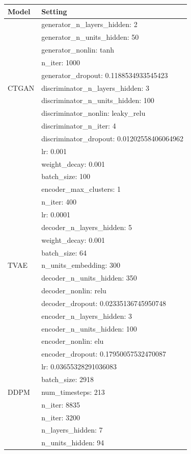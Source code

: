 \documentclass{article}
\theoremstyle{plain}
\theoremstyle{definition}
\theoremstyle{remark}
\begin{document}
\begin{table}[ht!]
\centering
\begin{tabular}{l|l}
\toprule
\textbf{Model} & \textbf{Setting} \\
\midrule
 & generator\_n\_layers\_hidden: 2\\ 
 & generator\_n\_units\_hidden: 50\\ 
 & generator\_nonlin: tanh\\ 
 & n\_iter: 1000\\
 & generator\_dropout: 0.1188534933545423\\ 
 CTGAN  & discriminator\_n\_layers\_hidden: 3\\ 
 & discriminator\_n\_units\_hidden: 100\\ 
 &discriminator\_nonlin: leaky\_relu\\
 & discriminator\_n\_iter: 4\\ 
 & discriminator\_dropout: 0.01202558406064962\\ 
 & lr: 0.001\\ 
 & weight\_decay: 0.001\\ 
 & batch\_size: 100\\ 
 &encoder\_max\_clusters: 1\\
\bottomrule
&n\_iter: 400\\
&lr: 0.0001\\
&decoder\_n\_layers\_hidden: 5\\
&weight\_decay: 0.001\\
&batch\_size: 64\\
TVAE  &n\_units\_embedding: 300\\ 
& decoder\_n\_units\_hidden: 350\\
&decoder\_nonlin: relu\\
&decoder\_dropout: 0.02335136745950748\\ 
&encoder\_n\_layers\_hidden: 3\\ 
&encoder\_n\_units\_hidden: 100\\
&encoder\_nonlin: elu\\
&encoder\_dropout: 0.17950057532470087\\
\bottomrule
&lr: 0.03655328291036083\\
&batch\_size: 2918\\
DDPM &num\_timesteps: 213\\
&n\_iter: 8835\\
\bottomrule
&n\_iter: 3200\\
&n\_layers\_hidden: 7\\
&n\_units\_hidden: 94\\

\end{tabular}
\end{table}
\end{document}
